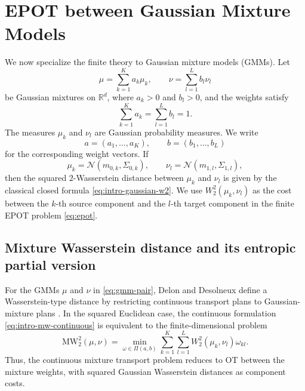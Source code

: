 \documentclass[a4paper,11pt]{article}
\numberwithin{equation}{section}
\newcommand{\RR}{\mathbb{R}}
\newcommand{\MW}{\mathrm{MW}}
\begin{document}
\section{EPOT between Gaussian Mixture Models}\label{sec:gmm-epot}
We now specialize the finite theory to Gaussian mixture models (GMMs). Let
\begin{equation}\label{eq:gmm-pair}
  \mu = \sum_{k=1}^{K}a_k\mu_k,\qquad \nu = \sum_{l=1}^{L}b_l\nu_l
\end{equation}
be Gaussian mixtures on $\RR^d$, where $a_k>0$ and $b_l>0$, and the weights satisfy
\begin{equation*}
  \sum_{k=1}^{K}a_k=\sum_{l=1}^{L}b_l=1.
\end{equation*}
The measures $\mu_k$ and $\nu_l$ are Gaussian probability measures. We write
\begin{equation*}
  a=(a_1,\ldots,a_K),\qquad b=(b_1,\ldots,b_L)
\end{equation*}
for the corresponding weight vectors. If
\begin{equation*}
  \mu_k=\mathcal N(m_{0,k},\Sigma_{0,k}),\qquad
  \nu_l=\mathcal N(m_{1,l},\Sigma_{1,l}),
\end{equation*}
then the squared $2$-Wasserstein distance between $\mu_k$ and $\nu_l$ is given by the classical closed formula \eqref{eq:intro-gaussian-w2}. We use $W_2^2(\mu_k,\nu_l)$ as the cost between the $k$-th source component and the $l$-th target component in the finite EPOT problem \eqref{eq:epot}.

\subsection{Mixture Wasserstein distance and its entropic partial version}\label{subsec:mw}
For the GMMs $\mu$ and $\nu$ in \eqref{eq:gmm-pair}, Delon and Desolneux define a Wasserstein-type distance by restricting continuous transport plans to Gaussian-mixture plans \cite{delon-2020}. In the squared Euclidean case, the continuous formulation \eqref{eq:intro-mw-continuous} is equivalent to the finite-dimensional problem
\begin{equation}\label{eq:mw-discrete}
  \MW_2^2(\mu,\nu)=\min_{\omega\in\Pi(a,b)} \sum_{k=1}^{K}\sum_{l=1}^{L}W_2^2(\mu_k,\nu_l)\omega_{kl}.
\end{equation}
Thus, the continuous mixture transport problem reduces to OT between the mixture weights, with squared Gaussian Wasserstein distances as component costs.
\end{document}
